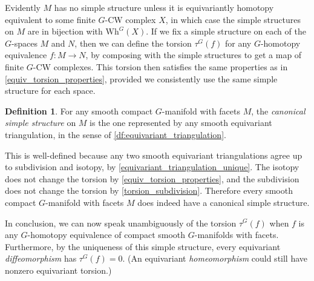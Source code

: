 \documentclass[11pt]{amsart}
\theoremstyle{definition}
\newtheorem{defn}{Definition}[section]
\numberwithin{equation}{section}
\numberwithin{figure}{section}
\newcommand{\Wh}{\mathrm{Wh}}
\begin{document}
Evidently $M$ has no simple structure unless it is equivariantly homotopy equivalent to some finite $G$-CW complex $X$, in which case the simple structures on $M$ are in bijection with $\Wh^G(X)$. If we fix a simple structure on each of the $G$-spaces $M$ and $N$, then we can define the torsion $\tau^G(f)$ for any $G$-homotopy equivalence $f\colon M \to N$, by composing with the simple structures to get a map of finite $G$-CW complexes. This torsion then satisfies the same properties as in \autoref{equiv_torsion_properties}, provided we consistently use the same simple structure for each space.

\begin{defn}
	For any smooth compact $G$-manifold with facets $M$, the \emph{canonical simple structure} on $M$ is the one represented by any smooth equivariant triangulation, in the sense of \autoref{df:equivariant_triangulation}.
\end{defn}

This is well-defined because any two smooth equivariant triangulations agree up to subdivision and isotopy, by \autoref{equivariant_triangulation_unique}. The isotopy does not change the torsion by \autoref{equiv_torsion_properties}, and the subdivision does not change the torsion by \autoref{torsion_subdivision}. Therefore every smooth compact $G$-manifold with facets $M$ does indeed have a canonical simple structure.

In conclusion, we can now speak unambiguously of the torsion $\tau^G(f)$ when $f$ is any $G$-homotopy equivalence of compact smooth $G$-manifolds with facets. Furthermore, by the uniqueness of this simple structure, every equivariant \emph{diffeomorphism} has $\tau^G(f) = 0$. (An equivariant \emph{homeomorphism} could still have nonzero equivariant torsion.)
\end{document}
